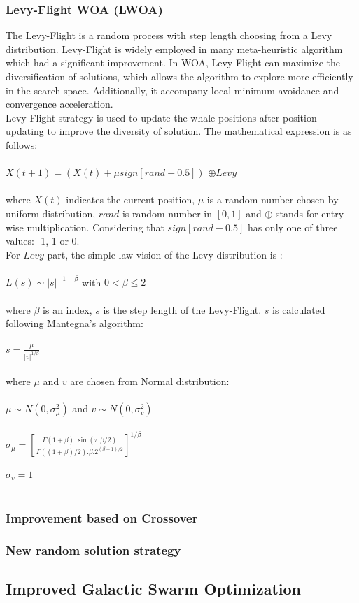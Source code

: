 \documentclass[a4paper]{article}
\begin{document}
\subsubsection{Levy-Flight WOA (LWOA)}
The Levy-Flight is a random process with step length choosing from a Levy distribution. Levy-Flight is widely employed in many meta-heuristic algorithm which had a significant improvement. In WOA, Levy-Flight can maximize the diversification of solutions, which allows the algorithm to explore more efficiently in the search space. Additionally, it accompany local minimum avoidance and convergence acceleration. \\
Levy-Flight strategy is used to update the whale positions after position updating to improve the diversity of solution. The mathematical expression is as follows: \\ \\
$X(t+1) = (X(t) + \mu sign[rand - 0.5])$ $\oplus  Levy$ \\ \\
where $X(t)$ indicates the current position, $\mu$ is a random number chosen by uniform distribution, $rand$ is random number in $[0,1]$ and $\oplus$ stands for entry-wise multiplication. Considering that $sign[rand - 0.5]$ has only one of three values: -1, 1 or 0. \\
For $Levy$ part, the simple law vision of the Levy distribution is : \\ \\
$L(s) \sim |s|^{-1-\beta}$ with $0 < \beta \leq 2$ \\ \\
where $\beta$ is an index, $s$ is the step length of the Levy-Flight. $s$ is calculated following Mantegna’s algorithm: \\ \\
$s = \frac{\mu}{|v|^{1/\beta}}$ \\ \\
where $\mu$ and $v$ are chosen from Normal distribution: \\ \\
$\mu \sim N(0, \sigma _{\mu}^2)$ and $v \sim N(0, \sigma _{v}^2)$ \\ \\
$ \sigma _{\mu} = [\frac{\Gamma (1 + \beta).\sin (\pi .\beta/2)}{\Gamma ((1 + \beta)/2).\beta .2^{(\beta - 1)/2}}]^{1/\beta}$ \\ \\
$ \sigma _{v} = 1$ \\ \\
\subsubsection{Improvement based on Crossover}
\subsubsection{New random solution strategy}

\subsection{Improved Galactic Swarm Optimization}
\end{document}
